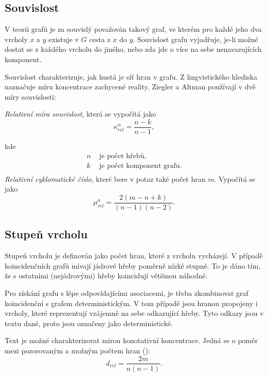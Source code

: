 \documentclass[dp.tex]{subfiles}
\begin{document}
\subsection{Souvislost}
V teorii grafů je za souvislý považován takový graf, ve kterém pro každé jeho dva vrcholy $x$ a $y$ existuje v $G$ cesta z $x$ do $y$. Souvislost grafu vyjadřuje, je-li možné dostat se z každého vrcholu do jiného, nebo zda jde o více na sebe nenavazujících komponent.

Souvislost charakterizuje, jak hustá je síť hran v grafu. Z lingvistického hlediska naznačuje míru koncentrace zachycené reality. Ziegler a Altman používají v \cite{ZieglerAltmann2002} dvě míry souvislosti:

\textit{Relativní míra souvislost}, která se vypočítá jako
\begin{equation}
\kappa_\textit{rel}^\alpha=\frac{n-k}{n-1},
\end{equation}

kde
\begin{align*}
	n & \text{ je počet hřebů,}\\
	k & \text{ je počet komponent grafu.}\\
\end{align*}  
\textit{Relativní cyklomatické číslo}, které bere v potaz také počet hran $m$. Vypočítá se jako
\begin{equation}
\mu_\textit{rel}^\alpha=\frac{2(m-n+k)}{(n-1)(n-2)}.
\end{equation}

\subsection{Stupeň vrcholu}
Stupeň vrcholu je definován jako počet hran, které z vrcholu vycházejí. V případě koincidenčních grafů mívají jádrové hřeby poměrně nízké stupně. To je dáno tím, že s ostatními (nejádrovými) hřeby koincidují většinou náhodně.

Pro získání grafu s lépe odpovídajícími asociacemi, je třeba zkombinovat graf koincidenční s grafem deterministickým. V tom případě jsou hranou propojeny i vrcholy, které reprezentují vzájemně na sebe odkazující hřeby. Tyto odkazy jsou v textu dané, proto jsou označeny jako deterministické.

Text je možné charakterizovat mírou konotativní koncentrace. Jedná se o poměr mezi pozorovaným a možným počtem hran (\cite[str. 312]{Wimmer2003}):
\begin{equation}
d_\textit{rel}=\frac{2m}{n(n-1)}.
\end{equation}
\end{document}
